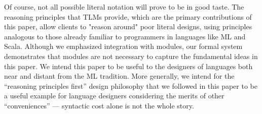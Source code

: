 \documentclass[acmsmall,screen]{acmart}
\newcommand{\li}[1]{\lstinline[basicstyle=\ttfamily\fontsize{9pt}{1em}\selectfont]{#1}}
\begin{document}
Of course, not all possible literal notation will prove to be in good taste. %
The reasoning principles that TLMs provide, which are the primary contributions of this paper, allow clients to "reason around" poor literal designs, using principles analogous to those already familiar to programmers in languages like ML and Scala. Although we emphasized integration with modules, our formal system demonstrates that modules are not necessary to capture the fundamental ideas in this paper. We intend this paper to be useful to the designers of languages both near and distant from the ML tradition. More generally, we intend for the ``reasoning principles first'' design philosophy that we followed in this paper to be a useful example for language designers considering the merits of other ``conveniences'' --- syntactic cost alone is not the whole story.%

\end{document}
